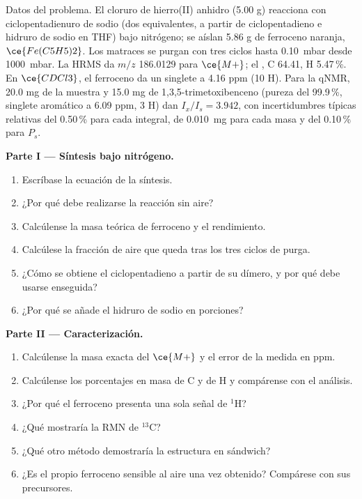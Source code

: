\begin{problem}
\label{pb:b3:lab-techniques-3:1}
Datos del problema. El cloruro de hierro(II) anhidro (5.00 g) reacciona con ciclopentadienuro de
sodio (dos equivalentes, a partir de ciclopentadieno e hidruro de sodio en
THF) bajo nitrógeno; se aíslan 5.86 g de ferroceno naranja, $\ce{Fe(C5H5)2}$. Los matraces se
purgan con tres ciclos hasta \qty{0.10}{mbar} desde \qty{1000}{mbar}. La HRMS da $m/z$ 186.0129 para $\ce{M+}$; el , C 64.41, H 5.47\,\%. En $\ce{CDCl3}$, el ferroceno da un singlete a 4.16 ppm (10 H). Para la qNMR,
20.0 mg de la muestra y 15.0 mg de 1,3,5-trimetoxibenceno (pureza del 99.9\,\%, singlete
aromático a 6.09 ppm, 3 H) dan $I_x/I_s = 3.942$, con incertidumbres típicas relativas del 0.50\,\% para cada
integral, de \qty{0.010}{mg} para cada masa y del 0.10\,\% para $P_s$.

\medskip\noindent\textbf{Parte I --- Síntesis bajo nitrógeno.}
\begin{enumerate}
  \item Escríbase la ecuación de la síntesis.
  \item ¿Por qué debe realizarse la reacción sin aire?
  \item Calcúlense la masa teórica de ferroceno y el rendimiento.
  \item Calcúlese la fracción de aire que queda tras los tres ciclos de purga.
  \item ¿Cómo se obtiene el ciclopentadieno a partir de su dímero, y por qué debe usarse enseguida?
  \item ¿Por qué se añade el hidruro de sodio en porciones?
\end{enumerate}

\medskip\noindent\textbf{Parte II --- Caracterización.}
\begin{enumerate}[resume]
  \item Calcúlense la masa exacta del $\ce{M+}$ y el error de la medida en ppm.
  \item Calcúlense los porcentajes en masa de C y de H y compárense con el análisis.
  \item ¿Por qué el ferroceno presenta una sola señal de $^1$H?
  \item ¿Qué mostraría la RMN de $^{13}$C?
  \item ¿Qué otro método demostraría la estructura en sándwich?
  \item ¿Es el propio ferroceno sensible al aire una vez obtenido? Compárese con sus precursores.
\end{enumerate}


\end{problem}
